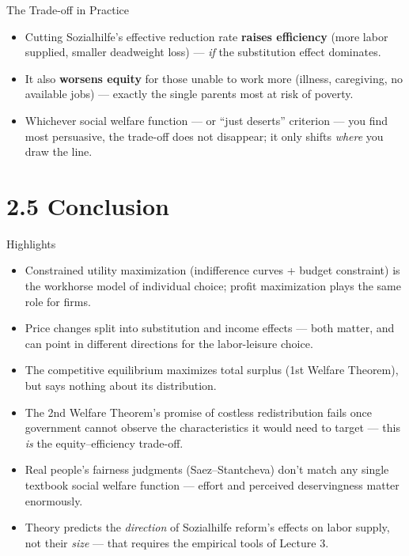 \documentclass[11pt,aspectratio=169]{beamer}
\begin{document}
\begin{frame}{The Trade-off in Practice}
  \begin{itemize}
    \item Cutting Sozialhilfe's effective reduction rate \textbf{raises efficiency} (more labor supplied, smaller deadweight loss) --- \emph{if} the substitution effect dominates.
    \item It also \textbf{worsens equity} for those unable to work more (illness, caregiving, no available jobs) --- exactly the single parents most at risk of poverty.
    \item Whichever social welfare function --- or ``just deserts'' criterion --- you find most persuasive, the trade-off does not disappear; it only shifts \emph{where} you draw the line.
  \end{itemize}
\end{frame}

\section{2.5 Conclusion}

\begin{frame}{Highlights}
  \small
  \begin{itemize}
    \item Constrained utility maximization (indifference curves + budget constraint) is the workhorse model of individual choice; profit maximization plays the same role for firms.
    \item Price changes split into substitution and income effects --- both matter, and can point in different directions for the labor-leisure choice.
    \item The competitive equilibrium maximizes total surplus (1st Welfare Theorem), but says nothing about its distribution.
    \item The 2nd Welfare Theorem's promise of costless redistribution fails once government cannot observe the characteristics it would need to target --- this \emph{is} the equity--efficiency trade-off.
    \item Real people's fairness judgments (Saez--Stantcheva) don't match any single textbook social welfare function --- effort and perceived deservingness matter enormously.
    \item Theory predicts the \emph{direction} of Sozialhilfe reform's effects on labor supply, not their \emph{size} --- that requires the empirical tools of Lecture 3.
  \end{itemize}
\end{frame}
\end{document}
